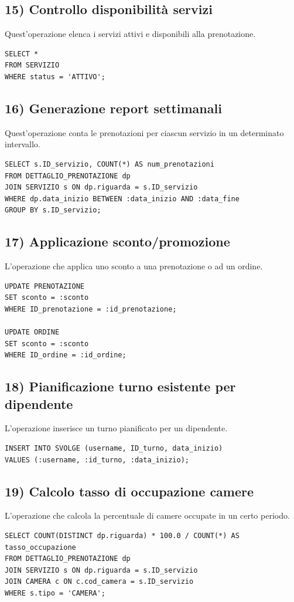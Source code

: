 \documentclass[a4paper,12pt]{report}
\begin{document}
\subsection*{15) Controllo disponibilità servizi}
Quest'operazione elenca i servizi attivi e disponibili alla prenotazione.
\begin{verbatim}
SELECT *
FROM SERVIZIO
WHERE status = 'ATTIVO';
\end{verbatim}

\subsection*{16) Generazione report settimanali}
Quest'operazione conta le prenotazioni per ciascun servizio in un determinato intervallo.
\begin{verbatim}
SELECT s.ID_servizio, COUNT(*) AS num_prenotazioni
FROM DETTAGLIO_PRENOTAZIONE dp
JOIN SERVIZIO s ON dp.riguarda = s.ID_servizio
WHERE dp.data_inizio BETWEEN :data_inizio AND :data_fine
GROUP BY s.ID_servizio;
\end{verbatim}

\subsection*{17) Applicazione sconto/promozione}
L'operazione che applica uno sconto a una prenotazione o ad un ordine.
\begin{verbatim}
UPDATE PRENOTAZIONE
SET sconto = :sconto
WHERE ID_prenotazione = :id_prenotazione;

UPDATE ORDINE
SET sconto = :sconto
WHERE ID_ordine = :id_ordine;
\end{verbatim}

\subsection*{18) Pianificazione turno esistente per dipendente}
L'operazione inserisce un turno pianificato per un dipendente.
\begin{verbatim}
INSERT INTO SVOLGE (username, ID_turno, data_inizio)
VALUES (:username, :id_turno, :data_inizio);
\end{verbatim}

\subsection*{19) Calcolo tasso di occupazione camere}
L'operazione che calcola la percentuale di camere occupate in un certo periodo.
\begin{verbatim}
SELECT COUNT(DISTINCT dp.riguarda) * 100.0 / COUNT(*) AS tasso_occupazione
FROM DETTAGLIO_PRENOTAZIONE dp
JOIN SERVIZIO s ON dp.riguarda = s.ID_servizio
JOIN CAMERA c ON c.cod_camera = s.ID_servizio
WHERE s.tipo = 'CAMERA';
\end{verbatim}
\end{document}
